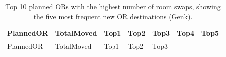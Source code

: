 \documentclass[
]{article}
\begin{document}
\begin{longtable}[]{@{}
  >{\centering\arraybackslash}p{}
  >{\centering\arraybackslash}p{}
  >{\centering\arraybackslash}p{}
  >{\centering\arraybackslash}p{}
  >{\centering\arraybackslash}p{}
  >{\centering\arraybackslash}p{}
  >{\centering\arraybackslash}p{}@{}}
\caption{Top 10 planned ORs with the highest number of room swaps,
showing the five most frequent new OR destinations (Genk).
\label{tab:room_swap_or}}\tabularnewline
\toprule\noalign{}
\begin{minipage}[b]{\linewidth}\centering
PlannedOR
\end{minipage} & \begin{minipage}[b]{\linewidth}\centering
TotalMoved
\end{minipage} & \begin{minipage}[b]{\linewidth}\centering
Top1
\end{minipage} & \begin{minipage}[b]{\linewidth}\centering
Top2
\end{minipage} & \begin{minipage}[b]{\linewidth}\centering
Top3
\end{minipage} & \begin{minipage}[b]{\linewidth}\centering
Top4
\end{minipage} & \begin{minipage}[b]{\linewidth}\centering
Top5
\end{minipage} \\
\midrule\noalign{}
\endfirsthead
\toprule\noalign{}
\begin{minipage}[b]{\linewidth}\centering
PlannedOR
\end{minipage} & \begin{minipage}[b]{\linewidth}\centering
TotalMoved
\end{minipage} & \begin{minipage}[b]{\linewidth}\centering
Top1
\end{minipage} & \begin{minipage}[b]{\linewidth}\centering
Top2
\end{minipage} & \begin{minipage}[b]{\linewidth}\centering
Top3
\end{minipage} & \begin{minipage}[b]{\linewidth}\centering

\end{minipage}
\end{longtable}
\end{document}
